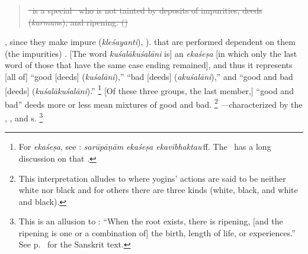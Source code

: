 \begin{quote}
\st{\Isvara\ is a special \purusa\ who is not tainted by deposits of impurities, deeds (\emph{karman\/}s), and ripening. ()}
\end{quote}

, since they make impure (\emph{kle\-śa\-ya\-nti}), ).   that are performed dependent on them (the impurities) .  [The word \emph{kuśalākuśalāni} is] an \emph{ekaśeṣa\/} [in which only the last word of those that have the same case ending remained], and thus it represents [all of] ``good [deeds] (\emph{kuśalāni}),'' ``bad [deeds] (\emph{akuśalāni}),'' and ``good and bad [deeds] (\emph{kuśalākuśalāni}).''%
  \footnote{For \emph{ekaśeṣa}, see : \emph{sarūpāṇām ekaśeṣa ekavibhaktau}\,ff.  The \VMBh\ has a long discussion on that \sutra.}  %
[Of these three groups, the last member,] ``good and bad'' deeds more or less mean mixtures of good and bad.%
  \footnote{This interpretation alludes to  where yogins' actions are said to be neither white nor black and for others there are three kinds (white, black, and white and black).}  %
---characterized by the , , and s.%
  \footnote{This is an allusion to : ``When the root exists, there is ripening, [and the ripening is one or a combination of] the birth, length of life, or experiences.''  See p.~\pageref{STR213} for the Sanskrit text.}  %
